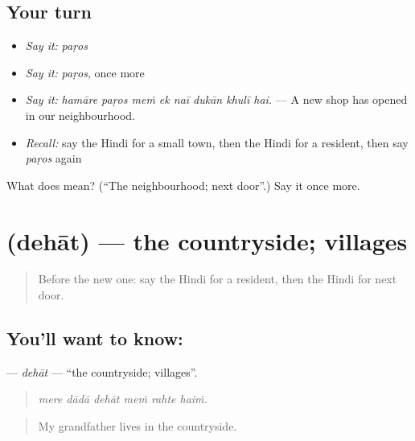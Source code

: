 \subsection*{Your turn}
\begin{itemize}
\raggedright
  \item \emph{Say it:} \emph{paṛos}
  \item \emph{Say it:} \emph{paṛos}, once more
  \item \emph{Say it:} \emph{hamāre paṛos meṁ ek naī dukān khulī hai.} — A new shop has opened in our neighbourhood.
  \item \emph{Recall:} say the Hindi for a small town, then the Hindi for a resident, then say \emph{paṛos} again
\end{itemize}

\begin{tcolorbox}[breakable,colback=teal!4,colframe=teal!35!black,title={Before you move on}]
What does  mean? (\textquotedblleft{}The neighbourhood; next door\textquotedblright{}.) Say it once more.
\end{tcolorbox}
\section[\texorpdfstring{\hi{देहात} (dehāt)}{देहात (dehāt)}]{ (dehāt) — the countryside; villages}

\label{lesson:HI-C421-dehat}



\begin{quote}
Before the new one: say the Hindi for a resident, then the Hindi for next door.
\end{quote}

\subsection*{You'll want to know: }
\textbf{} — \emph{dehāt} — \textquotedblleft{}the countryside; villages\textquotedblright{}.

\begin{quote}
     
\end{quote}

\begin{quote}
\emph{mere dādā dehāt meṁ rahte haiṁ.}
\end{quote}

\begin{quote}
My grandfather lives in the countryside.
\end{quote}

